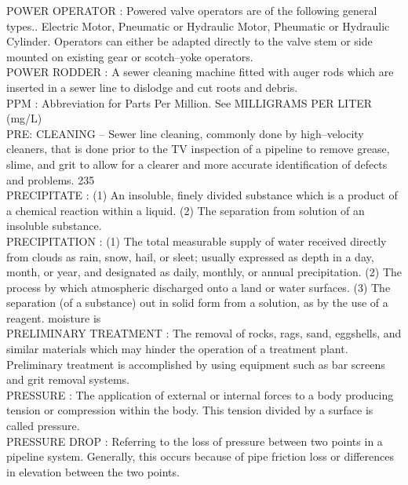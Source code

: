 POWER OPERATOR :   Powered valve operators are of the following general types.. Electric Motor, Pneumatic or Hydraulic Motor, Pheumatic or Hydraulic Cylinder. Operators can either be adapted directly to the valve stem or side mounted on existing gear or scotch–yoke operators.\\
\vspace{0.15cm}
POWER RODDER :  A sewer cleaning machine fitted with auger rods which are inserted in a sewer line to dislodge and cut roots and debris. \\
\vspace{0.15cm}
PPM :  Abbreviation for Parts Per Million. See MILLIGRAMS PER LITER (mg/L)\\
\vspace{0.15cm}
PRE: CLEANING – Sewer line cleaning, commonly done by high–velocity cleaners, that is done prior to the TV inspection of a pipeline to remove grease, slime, and grit to allow for a clearer and more accurate identification of defects and problems. 235 \\
\vspace{0.15cm}
PRECIPITATE :  (1)     An insoluble, finely divided substance which is a product of a chemical reaction within a liquid.  (2)     The separation from solution of an insoluble substance.\\
\vspace{0.15cm}
PRECIPITATION :  (1) The total measurable supply of water received directly from clouds as rain, snow, hail, or sleet; usually expressed as depth in a day, month, or year, and designated as daily, monthly, or annual precipitation. (2) The process by which atmospheric discharged onto a land or water surfaces. (3) The separation (of a substance) out in solid form from a solution, as by the use of a reagent. moisture is \\
\vspace{0.15cm}
PRELIMINARY TREATMENT :  The removal of rocks, rags, sand, eggshells, and similar materials which may hinder the operation of a treatment plant. Preliminary treatment is accomplished by using equipment such as bar screens and grit removal systems. \\
\vspace{0.15cm}
PRESSURE :   The application of external or internal forces to a body producing tension or compression within the body. This tension divided by a surface is called pressure.\\
\vspace{0.15cm}
PRESSURE DROP :   Referring to the loss of pressure between two points in a pipeline system. Generally, this occurs because of pipe friction loss or differences in elevation between the two points.\\
